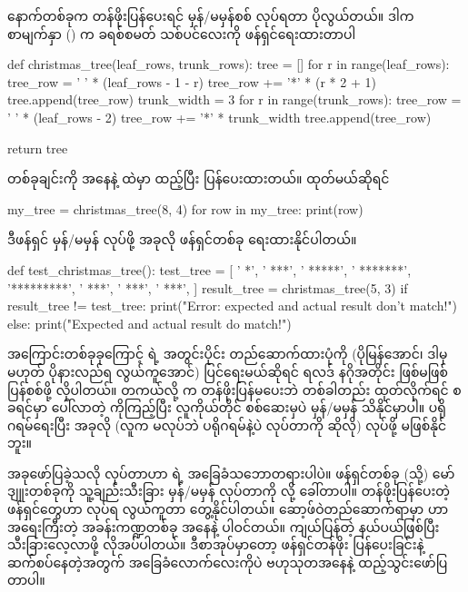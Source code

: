 နောက်တစ်ခုက တန်ဖိုးပြန်ပေးရင် မှန်/မမှန်စစ်  လုပ်ရတာ ပိုလွယ်တယ်။ ဒါက စာမျက်နှာ (\fRefNo{\pageref{lst:christmastree1}}) က ခရစ်စမတ် သစ်ပင်လေးကို ဖန်ရှင်ရေးထားတာပါ
%
\begin{py}
def christmas_tree(leaf_rows, trunk_rows):
    tree = []
    for r in range(leaf_rows):
        tree_row = ' ' * (leaf_rows - 1 - r)
        tree_row += '*' * (r * 2 + 1)
        tree.append(tree_row)
    trunk_width = 3
    for r in range(trunk_rows):
        tree_row = ' ' * (leaf_rows - 2)
        tree_row += '*' * trunk_width
        tree.append(tree_row)

    return tree
\end{py}
%
 တစ်ခုချင်းကို  အနေနဲ့  ထဲမှာ ထည့်ပြီး  ပြန်ပေးထားတယ်။  ထုတ်မယ်ဆိုရင်
%
\begin{py}
my_tree = christmas_tree(8, 4)
for row in my_tree:
    print(row)
\end{py}
%
ဒီဖန်ရှင် မှန်/မမှန်  လုပ်ဖို့ အခုလို ဖန်ရှင်တစ်ခု ရေးထားနိုင်ပါတယ်။  
%
\begin{py}
def test_christmas_tree():
    test_tree = [
        '    *',
        '   ***',
        '  *****',
        ' *******',
        '*********',
        '   ***',
        '   ***',
        '   ***',
    ]
    result_tree = christmas_tree(5, 3)
    if result_tree != test_tree:
        print("Error: expected and actual result don't match!")
    else:
        print("Expected and actual result do match!")
\end{py}
%
အကြောင်းတစ်ခုခုကြောင့်  ရဲ့ အတွင်းပိုင်း တည်ဆောက်ထားပုံကို (ပိုမြန်အောင်၊ ဒါမှမဟုတ် ပိုနားလည်ရ လွယ်ကူအောင်) ပြင်ရေးမယ်ဆိုရင် ရလဒ် နဂိုအတိုင်း ဖြစ်မဖြစ် ပြန်စစ်ဖို့ လိုပါတယ်။    တကယ်လို့  က တန်ဖိုးပြန်မပေးဘဲ တစ်ခါတည်း   ထုတ်လိုက်ရင် စခရင်မှာ ပေါ်လာတဲ့  ကိုကြည့်ပြီး လူကိုယ်တိုင် စစ်ဆေးမှပဲ မှန်/မမှန်  သိနိုင်မှာပါ။ ပရိုဂရမ်ရေးပြီး အခုလို  (လူက  မလုပ်ဘဲ ပရိုဂရမ်နဲ့ပဲ  လုပ်တာကို ဆိုလို) လုပ်ဖို့ မဖြစ်နိုင်ဘူး။ 

အခုဖော်ပြခဲ့သလို  လုပ်တာဟာ  ရဲ့ အခြေခံသဘောတရားပါပဲ။ ဖန်ရှင်တစ်ခု (သို့) မော်ဒျူးတစ်ခုကို သူ့ချည်းသီးခြား မှန်/မမှန်  လုပ်တာကို  လို့ ခေါ်တာပါ။ တန်ဖိုးပြန်ပေးတဲ့ ဖန်ရှင်တွေဟာ  လုပ်ရ လွယ်ကူတာ တွေ့နိုင်ပါတယ်။ ဆော့ဖ်ဝဲတည်ဆောက်ရာမှာ  ဟာ အရေးကြီးတဲ့ အခန်းကဏ္ဍတစ်ခု အနေနဲ့ ပါဝင်တယ်။ ကျယ်ပြန်တဲ့ နယ်ပယ်ဖြစ်ပြီး သီးခြားလေ့လာဖို့ လိုအပ်ပါတယ်။ ဒီစာအုပ်မှာတော့  ဖန်ရှင်တန်ဖိုး ပြန်ပေးခြင်းနဲ့ ဆက်စပ်နေတဲ့အတွက် အခြေခံလောက်လေးကိုပဲ ဗဟုသုတအနေနဲ့ ထည့်သွင်းဖော်ပြတာပါ။

